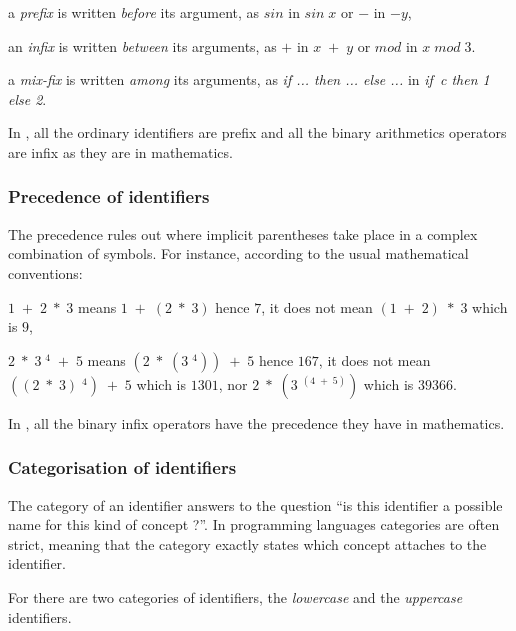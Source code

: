 \begin{citemize}
\item a {\em prefix} is written {\em before} its argument, as $sin$ in
 $sin\; x$ or $-$ in $- y$,
\item an {\em infix} is written {\em between} its arguments, as $+$ in
 $x\; +\; y$ or $mod$ in $x\; mod \;3$.
\item a {\em mix-fix} is written {\em among} its arguments, as
  {\em if ... then ... else ...} in
  {\em if\ c then 1 else 2}.
\end{citemize}

In {\focal}, all the ordinary identifiers are prefix and all the binary
arithmetics operators are infix as they are in mathematics.

\subsubsection{Precedence of identifiers}

The precedence rules out where implicit parentheses take place in a
complex combination of symbols. For instance, according to the usual mathematical
conventions:
\begin{citemize}
\item $1\; +\; 2\; *\; 3$  means $1\; +\; (2\; *\; 3)$ hence $7$,
      it does not mean $(1\; +\; 2)\; *\; 3$ which is $9$,
\item $2\; *\; 3\; ^4\; +\; 5$ means
      $(2\; *\; (3\; ^4))\; +\; 5$ hence $167$, it does not mean
      $((2\; *\; 3)\; ^4)\; +\; 5$ which is $1301$,
      nor $2\; *\; (3\; ^{(4\; +\; 5)})$ which is $39366$.
\end{citemize}

In {\focal}, all the binary infix operators have the precedence they have in mathematics.

\subsubsection{Categorisation of identifiers}

The category of an identifier answers to the question ``is this identifier a
possible name for this kind of concept ?''.
In programming languages categories are often strict, meaning that the category
exactly states which concept attaches to the identifier.

For {\focal} there are two categories of identifiers, the {\em lowercase} and
the {\em uppercase} identifiers.

